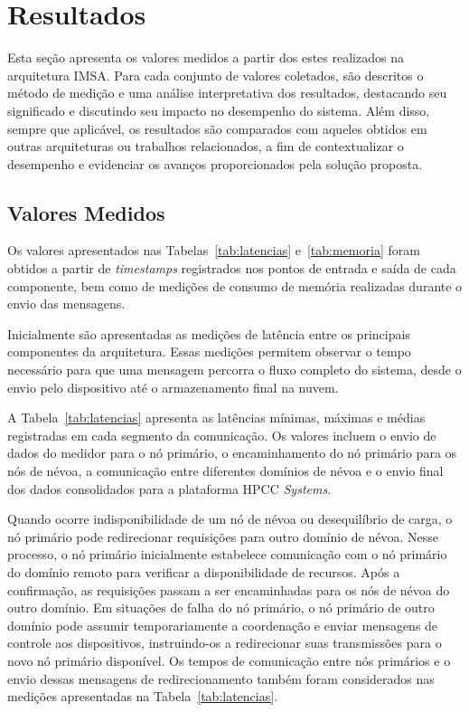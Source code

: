 \chapter{Resultados}\label{cap:resultados}

Esta seção apresenta os valores medidos a partir dos estes realizados na arquitetura \gls{IMSA}.
Para cada conjunto de valores coletados, são descritos o método de medição e uma análise interpretativa dos resultados, destacando seu significado e discutindo seu impacto no desempenho do sistema. 
Além disso, sempre que aplicável, os resultados são comparados com aqueles obtidos em outras arquiteturas ou trabalhos relacionados, a fim de contextualizar o desempenho e evidenciar os avanços proporcionados pela solução proposta.

\section{Valores Medidos}

Os valores apresentados nas Tabelas~\ref{tab:latencias} e~\ref{tab:memoria} foram obtidos a partir de \textit{timestamps} registrados nos pontos de entrada e saída de cada componente, bem como de medições de consumo de memória realizadas durante o envio das mensagens.

Inicialmente são apresentadas as medições de latência entre os principais componentes da arquitetura. Essas medições permitem observar o tempo necessário para que uma mensagem percorra o fluxo completo do sistema, desde o envio pelo dispositivo até o armazenamento final na nuvem.

A Tabela~\ref{tab:latencias} apresenta as latências mínimas, máximas e médias registradas em cada segmento da comunicação. Os valores incluem o envio de dados do medidor para o nó primário, o encaminhamento do nó primário para os nós de névoa, a comunicação entre diferentes domínios de névoa e o envio final dos dados consolidados para a plataforma \gls{HPCC} \textit{Systems}.

Quando ocorre indisponibilidade de um nó de névoa ou desequilíbrio de carga, o nó primário pode redirecionar requisições para outro domínio de névoa. Nesse processo, o nó primário inicialmente estabelece comunicação com o nó primário do domínio remoto para verificar a disponibilidade de recursos. Após a confirmação, as requisições passam a ser encaminhadas para os nós de névoa do outro domínio. Em situações de falha do nó primário, o nó primário de outro domínio pode assumir temporariamente a coordenação e enviar mensagens de controle aos dispositivos, instruindo-os a redirecionar suas transmissões para o novo nó primário disponível. Os tempos de comunicação entre nós primários e o envio dessas mensagens de redirecionamento também foram considerados nas medições apresentadas na Tabela~\ref{tab:latencias}. 

